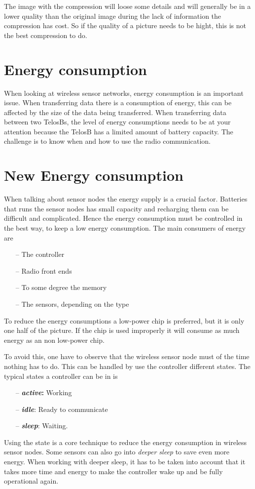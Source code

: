 The image with the compression will loose some details and will generally be in a lower quality than the original image during the lack of information the compression has cost. So if the quality of a picture needs to be hight, this is not the best compression to do.  

\section{Energy consumption}
When looking at wireless sensor networks, energy consumption is an important issue. When transferring data there is a consumption of energy, this can be affected by the size of the data being transferred. When transferring data between two TelosBs, the level of energy consumptions needs to be at your attention because the TelosB has a limited amount of battery capacity. The challenge is to know when and how to use the radio communication.

\section{New Energy consumption}
When talking about sensor nodes the energy supply is a crucial factor. Batteries that runs the sensor nodes has small capacity and recharging them can be difficult and complicated. Hence the energy consumption must be controlled in the best way, to keep a low energy consumption.
The main consumers of energy are
\begin{itemize}
	\item[--] The controller
	\item[--] Radio front ends
	\item[--] To some degree the memory
	\item[--] The sensors, depending on the type
\end{itemize}
	 
To reduce the energy consumptions a low-power chip is preferred, but it is only one half of the picture. If the chip is used improperly it will consume as much energy as an non low-power chip.

To avoid this, one have to observe that the wireless sensor node must of the time nothing has to do. This can be handled by use the controller different states. The typical states a controller can be in is
\begin{itemize}
	\item[--] \textbf{\emph{active}:} Working 
	\item[--] \textbf{\emph{idle}}: Ready to communicate 
	\item[--] \textbf{\emph{sleep}}: Waiting.
\end{itemize}
Using the state is  a core technique to reduce the energy consumption in wireless sensor nodes. Some sensors can also go into \emph{deeper sleep} to save even more energy. When working with deeper sleep, it has to be taken into account that it takes more time and energy to make the controller wake up and be fully operational again.

